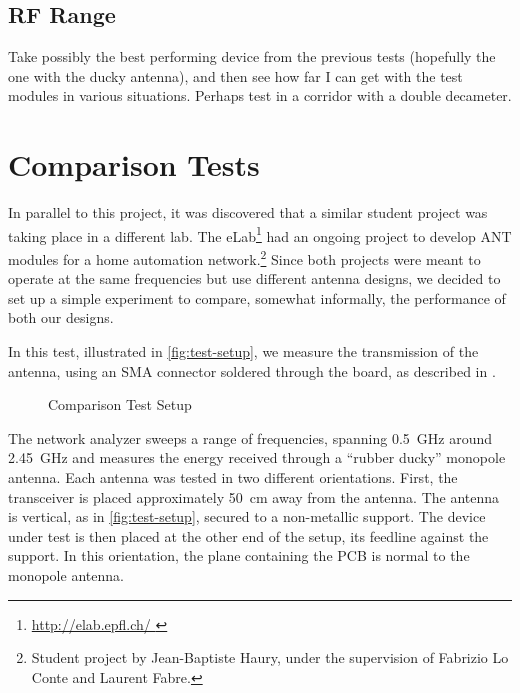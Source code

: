 \subsection{RF Range}

Take possibly the best performing device from the previous tests (hopefully the
one with the ducky antenna), and then see how far I can get with the test
modules in various situations. Perhaps test in a corridor with a double
decameter.



\section{Comparison Tests}

In parallel to this project, it was discovered that a similar student project
was taking place in a different lab. The eLab\footnote{ \url{
http://elab.epfl.ch/ }} had an ongoing project to develop ANT modules for a home
automation network.\footnote{Student project by Jean-Baptiste Haury, under the
supervision of Fabrizio Lo Conte and Laurent Fabre.}
Since both projects were meant to operate at the same frequencies but use
different antenna designs, we decided to set up a simple experiment to compare,
somewhat informally, the performance of both our designs. 


In this test, illustrated in \autoref{fig:test-setup}, we measure the
transmission of the antenna, using an SMA connector soldered through the board,
as described in \citep{DropoutGuide}.


\begin{figure}[htb]
  \begin{center}
  \end{center}
  \caption{Comparison Test Setup}
  \label{fig:test-setup}
\end{figure}

The network analyzer sweeps a range of frequencies, spanning \SI{0.5}{GHz}
around \SI{2.45}{GHz} and measures the energy received through a ``rubber
ducky'' monopole antenna. Each antenna was tested in two different orientations.
First, the transceiver is placed approximately \SI{50}{cm} away from the
antenna. The antenna is vertical, as in \autoref{fig:test-setup}, secured to
a non-metallic support. The device under test is then placed at the other end of
the setup, its feedline against the support. In this orientation, the plane
containing the PCB is normal to the monopole antenna.

